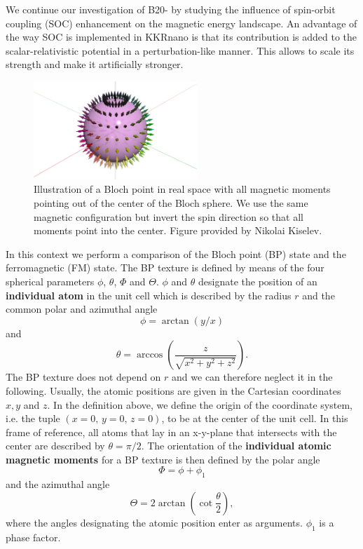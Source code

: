 \documentclass[graybox]{svmult}
\newcommand{\beq}{\begin{equation}}
\newcommand{\eeq}{\end{equation}}
\begin{document}
We continue our investigation of B20- by studying the influence of spin-orbit
coupling (SOC) enhancement on the magnetic energy landscape.
An advantage of the way SOC is implemented in KKRnano is that
its contribution is added to the scalar-relativistic
potential in a perturbation-like manner. This allows to scale its strength and make it
artificially stronger.
\begin{figure}[htb]
	\sidecaption
	\includegraphics[width=0.55\textwidth]{Figures/blochpoint.eps}
	\caption{Illustration of a Bloch point in real space with all magnetic moments
	pointing out of the center of the Bloch sphere.
	We use the same magnetic configuration but invert the spin direction so that all moments point
	into the center. Figure provided by Nikolai Kiselev.
	}
	\label{fig:mnge_blochpoint}
\end{figure}
In this context we perform a comparison of the Bloch point (BP) state 
and the ferromagnetic (FM) state.
The BP texture is defined by means of the four spherical parameters $\phi$, $\theta$, 
$\Phi$ and $\Theta$.
$\phi$ and $\theta$ designate the position of an \textbf{individual atom} in the unit cell
which is described by the radius $r$ and the common polar and azimuthal angle
\beq
\phi = \arctan{\left(y/x\right)}
\eeq
and
\beq
\theta = \arccos{\left( \frac{z}{\sqrt{x^2+y^2+z^2}} \right)}.
\eeq
The BP texture does not depend on $r$ and we can therefore neglect it in the following.
Usually, the atomic positions are given in the Cartesian coordinates $x,y$ and $z$.
In the definition above, we define the origin of the coordinate system, i.e. the tuple $(x=0, \, y=0, \, z=0)$,
to be at the center of the unit cell.
In this frame of reference, all atoms that lay in an x-y-plane that intersects with the center
are described by $\theta=\pi/2$.
The orientation of the \textbf{individual atomic magnetic moments} for a BP texture is then defined 
by the polar angle
\beq
\Phi = \phi + \phi_{1}
\eeq
and the azimuthal angle
\beq
\Theta = 2 \arctan{\left(\cot{\frac{\theta}{2}} \right)},
\eeq
where the angles designating the atomic position enter as arguments. $\phi_{1}$ is a phase factor.
\end{document}
